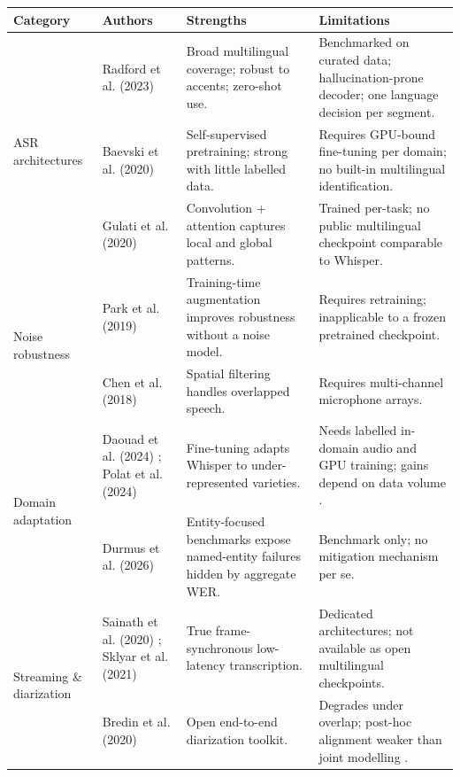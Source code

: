 \documentclass[12pt]{report}
\begin{document}
\begin{table}[htbp]
\centering
\footnotesize
\renewcommand{\arraystretch}{1.2}
\begin{tabular}{|p{2.2cm}|p{2.8cm}|p{4.4cm}|p{4.6cm}|}
\hline
\textbf{Category} & \textbf{Authors} & \textbf{Strengths} & \textbf{Limitations} \\ \hline

\multirow{3}{2.2cm}{ASR architectures}
& Radford et al. (2023) \cite{radford2023robust}
& Broad multilingual coverage; robust to accents; zero-shot use.
& Benchmarked on curated data; hallucination-prone decoder; one language decision per segment. \\ \cline{2-4}
& Baevski et al. (2020) \cite{baevski2020wav2vec}
& Self-supervised pretraining; strong with little labelled data.
& Requires GPU-bound fine-tuning per domain; no built-in multilingual identification. \\ \cline{2-4}
& Gulati et al. (2020) \cite{gulati2020conformer}
& Convolution + attention captures local and global patterns.
& Trained per-task; no public multilingual checkpoint comparable to Whisper. \\ \hline

\multirow{2}{2.2cm}{Noise robustness}
& Park et al. (2019) \cite{park2019specaugment}
& Training-time augmentation improves robustness without a noise model.
& Requires retraining; inapplicable to a frozen pretrained checkpoint. \\ \cline{2-4}
& Chen et al. (2018) \cite{chen2018multi}
& Spatial filtering handles overlapped speech.
& Requires multi-channel microphone arrays. \\ \hline

\multirow{2}{2.2cm}{Domain adaptation}
& Daouad et al. (2024) \cite{daouad2024optimizing}; Polat et al. (2024) \cite{polat2024implementation}
& Fine-tuning adapts Whisper to under-represented varieties.
& Needs labelled in-domain audio and GPU training; gains depend on data volume \cite{whisperfinetune2024}. \\ \cline{2-4}
& Durmus et al. (2026) \cite{durmus2026contextual}
& Entity-focused benchmarks expose named-entity failures hidden by aggregate WER.
& Benchmark only; no mitigation mechanism per se. \\ \hline

\multirow{2}{2.2cm}{Streaming \& diarization}
& Sainath et al. (2020) \cite{sainath2020streaming}; Sklyar et al. (2021) \cite{sklyar2021streaming}
& True frame-synchronous low-latency transcription.
& Dedicated architectures; not available as open multilingual checkpoints. \\ \cline{2-4}
& Bredin et al. (2020) \cite{bredin2020pyannote}
& Open end-to-end diarization toolkit.
& Degrades under overlap; post-hoc alignment weaker than joint modelling \cite{raj2021integration}. \\ \hline


\end{tabular}
\end{table}
\end{document}
